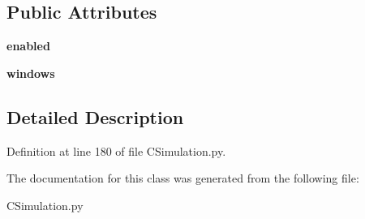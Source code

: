 \subsection*{Public Attributes}
\begin{DoxyCompactItemize}
\item 
\mbox{\label{class_c_simulation_1_1_simulation_1_1_no_m_a_s_s_models_1_1_windows_a91b39549c797bd5646357c8b6eecad0f}} 
{\bfseries enabled}
\item 
\mbox{\label{class_c_simulation_1_1_simulation_1_1_no_m_a_s_s_models_1_1_windows_a836fa8579b25f4eb7c5b634cee3d6a54}} 
{\bfseries windows}
\end{DoxyCompactItemize}


\subsection{Detailed Description}


Definition at line 180 of file C\+Simulation.\+py.



The documentation for this class was generated from the following file\+:\begin{DoxyCompactItemize}
\item 
C\+Simulation.\+py\end{DoxyCompactItemize}
